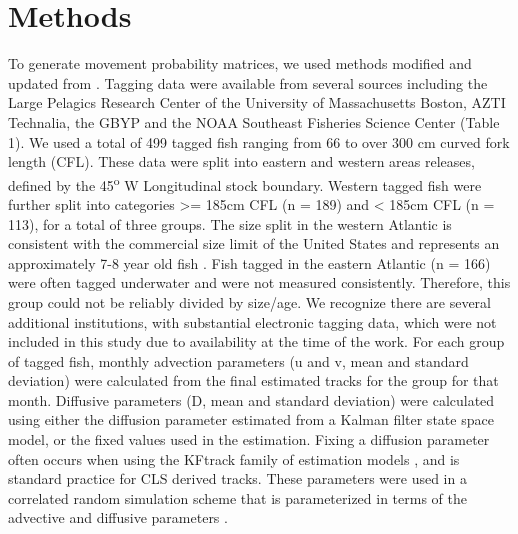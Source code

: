 \documentclass[
  authoryear,
  preprint,
  5p,
  onecolumn]{elsarticle}
\begin{document}
\section{Methods}\label{methods}

To generate movement probability matrices, we used methods modified and
updated from \citep{galuardi2014}. Tagging data were available from
several sources including the Large Pelagics Research Center of the
University of Massachusetts Boston, AZTI Technalia, the GBYP and the
NOAA Southeast Fisheries Science Center (Table 1). We used a total of
499 tagged fish ranging from 66 to over 300 cm curved fork length (CFL).
These data were split into eastern and western areas releases, defined
by the 45\textsuperscript{o} W Longitudinal stock boundary. Western
tagged fish were further split into categories \textgreater= 185cm CFL
(n = 189) and \textless{} 185cm CFL (n = 113), for a total of three
groups. The size split in the western Atlantic is consistent with the
commercial size limit of the United States and represents an
approximately 7-8 year old fish \citep{restrepo2010}. Fish tagged in the
eastern Atlantic (n = 166) were often tagged underwater and were not
measured consistently. Therefore, this group could not be reliably
divided by size/age. We recognize there are several additional
institutions, with substantial electronic tagging data, which were not
included in this study due to availability at the time of the work. For
each group of tagged fish, monthly advection parameters (u and v, mean
and standard deviation) were calculated from the final estimated tracks
for the group for that month. Diffusive parameters (D, mean and standard
deviation) were calculated using either the diffusion parameter
estimated from a Kalman filter state space model, or the fixed values
used in the estimation. Fixing a diffusion parameter often occurs when
using the KFtrack family of estimation models
\citep{sibert2003, lam2010}, and is standard practice for CLS derived
tracks. These parameters were used in a correlated random simulation
scheme that is parameterized in terms of the advective and diffusive
parameters \citep[\citet{sibert2006},\citet{galuardi2014}]{sibert2003}.
\end{document}
